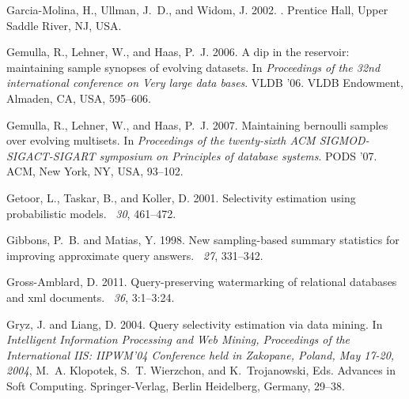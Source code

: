 \begin{thebibliography}{}
{\sc Garcia-Molina, H.}, {\sc Ullman, J.~D.}, {\sc and} {\sc Widom, J.} 2002.
.
\newblock Prentice Hall, Upper Saddle River, NJ, USA.

{\sc Gemulla, R.}, {\sc Lehner, W.}, {\sc and} {\sc Haas, P.~J.} 2006.
\newblock A dip in the reservoir: maintaining sample synopses of evolving
  datasets.
\newblock In {\em Proceedings of the 32nd international conference on Very
  large data bases}. VLDB '06. VLDB Endowment, Almaden, CA, USA, 595--606.

{\sc Gemulla, R.}, {\sc Lehner, W.}, {\sc and} {\sc Haas, P.~J.} 2007.
\newblock Maintaining bernoulli samples over evolving multisets.
\newblock In {\em Proceedings of the twenty-sixth ACM SIGMOD-SIGACT-SIGART
  symposium on Principles of database systems}. PODS '07. ACM, New York, NY,
  USA, 93--102.

{\sc Getoor, L.}, {\sc Taskar, B.}, {\sc and} {\sc Koller, D.} 2001.
\newblock Selectivity estimation using probabilistic models.
~{\em 30}, 461--472.

{\sc Gibbons, P.~B.} {\sc and} {\sc Matias, Y.} 1998.
\newblock New sampling-based summary statistics for improving approximate query
  answers.
~{\em 27}, 331--342.

{\sc Gross-Amblard, D.} 2011.
\newblock Query-preserving watermarking of relational databases and xml
  documents.
~{\em 36}, 3:1--3:24.

{\sc Gryz, J.} {\sc and} {\sc Liang, D.} 2004.
\newblock Query selectivity estimation via data mining.
\newblock In {\em Intelligent Information Processing and Web Mining,
  Proceedings of the International IIS: IIPWM'04 Conference held in Zakopane,
  Poland, May 17-20, 2004}, {M.~A. Klopotek}, {S.~T. Wierzchon}, {and}
  {K.~Trojanowski}, Eds. Advances in Soft Computing. Springer-Verlag, Berlin
  Heidelberg, Germany, 29--38.


\end{thebibliography}
